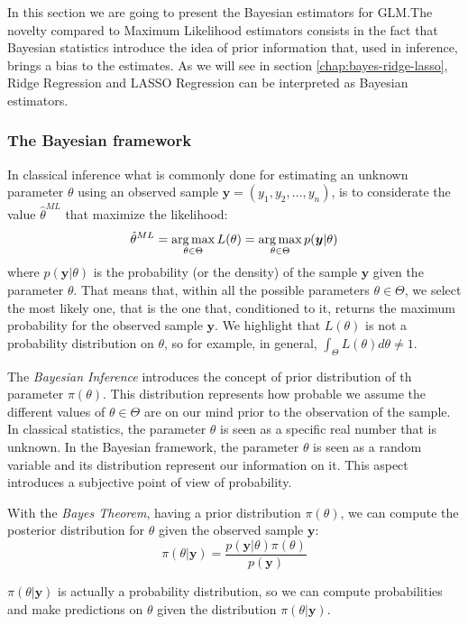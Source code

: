 \documentclass[a4paper, nobind]{templates/ociamthesis}
\theoremstyle{definition}
\theoremstyle{definition}
\theoremstyle{definition}
\theoremstyle{remark}
\begin{document}
In this section we are going to present the Bayesian estimators for GLM.The novelty compared to Maximum Likelihood estimators consists in the fact that Bayesian statistics introduce the idea of prior information that, used in inference, brings a bias to the estimates. As we will see in section \ref{chap:bayes-ridge-lasso}, Ridge Regression and LASSO Regression can be interpreted as Bayesian estimators.

\hypertarget{the-bayesian-framework}{%
\subsubsection{The Bayesian framework}\label{the-bayesian-framework}}

In classical inference what is commonly done for estimating an unknown parameter \(\theta\) using an observed sample \(\boldsymbol{y}=(y_1, y_2, \dots, y_n)\), is to considerate the value \(\hat{\theta}^{ML}\) that maximize the likelihood:
\[
\hat{\theta}^{ML} = \operatorname*{arg\,max}_{\theta\in\Theta}{L(\theta)} = \operatorname*{arg\,max}_{\theta\in\Theta}{p(\boldsymbol{y}|\theta)}
\]
where \(p(\boldsymbol{y}|\theta)\) is the probability (or the density) of the sample \(\boldsymbol{y}\) given the parameter \(\theta\). That means that, within all the possible parameters \(\theta\in\Theta\), we select the most likely one, that is the one that, conditioned to it, returns the maximum probability for the observed sample \(\boldsymbol{y}\). We highlight that \(L(\theta)\) is not a probability distribution on \(\theta\), so for example, in general, \(\int_{\Theta}{L(\theta)d\theta}\ne1\).

The \emph{Bayesian Inference} introduces the concept of prior distribution of th parameter \(\pi(\theta)\). This distribution represents how probable we assume the different values of \(\theta\in\Theta\) are on our mind prior to the observation of the sample. In classical statistics, the parameter \(\theta\) is seen as a specific real number that is unknown. In the Bayesian framework, the parameter \(\theta\) is seen as a random variable and its distribution represent our information on it. This aspect introduces a subjective point of view of probability.

With the \emph{Bayes Theorem}, having a prior distribution \(\pi(\theta)\), we can compute the posterior distribution for \(\theta\) given the observed sample \(\boldsymbol{y}\):
\[
\pi(\theta|\boldsymbol{y}) = \frac{p(\boldsymbol{y}|\theta)\pi(\theta)}{p(\boldsymbol{y})}
\]

\(\pi(\theta|\boldsymbol{y})\) is actually a probability distribution, so we can compute probabilities and make predictions on \(\theta\) given the distribution \(\pi(\theta|\boldsymbol{y})\).
\end{document}
